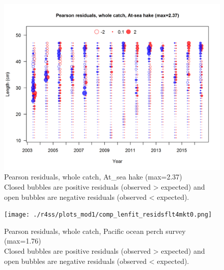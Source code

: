 \documentclass[12pt,]{article}
\begin{document}
\begin{figure}
\centering
\includegraphics{./r4ss/plots_mod1/comp_lenfit_residsflt2mkt0.png}
\caption{Pearson residuals, whole catch, At\_sea hake (max=2.37)\\
Closed bubbles are positive residuals (observed \textgreater{} expected)
and open bubbles are negative residuals (observed \textless{} expected).
\label{fig:ashop_len_pearson}}
\end{figure}

\begin{figure}
\centering
\texttt{[image: ./r4ss/plots\_mod1/comp\_lenfit\_residsflt4mkt0.png]}
\caption{Pearson residuals, whole catch, Pacific ocean perch survey
(max=1.76)\\
Closed bubbles are positive residuals (observed \textgreater{} expected)
and open bubbles are negative residuals (observed \textless{} expected).
\label{fig:pop_len_pearson}}
\end{figure}
\end{document}
